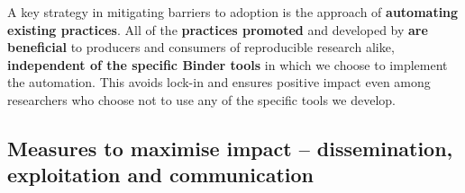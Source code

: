 A key strategy in mitigating barriers to adoption is the approach of \textbf{automating existing practices}.
All of the \textbf{practices promoted} and developed by \TheProject \textbf{are beneficial} to
producers and consumers of reproducible research alike,
\textbf{independent of the specific Binder tools} in which we choose to implement the automation.
This avoids lock-in and ensures positive impact even among researchers who choose not to use any of the specific tools we develop.

\subsection{Measures to maximise impact -- dissemination, exploitation and communication}


